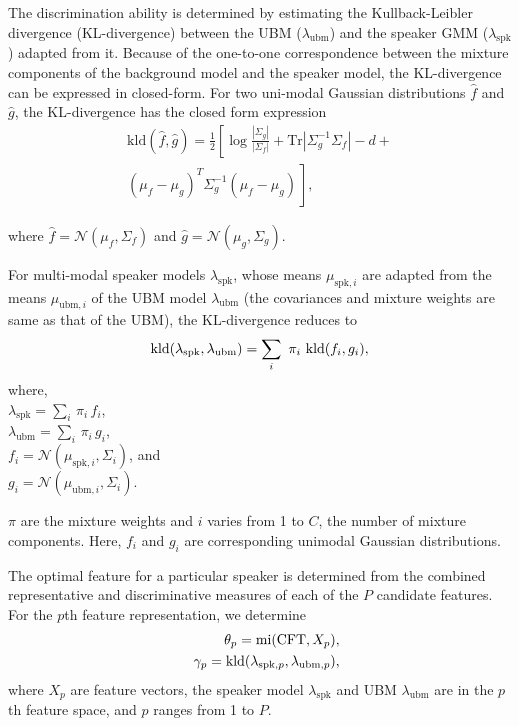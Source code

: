\documentclass[preprint,12pt,5p]{elsarticle}
\begin{document}
The discrimination ability is determined by estimating the Kullback-Leibler divergence
(KL-divergence) between the UBM ($\lambda_{\textrm{ubm}}$) and the speaker GMM ($\lambda_{\textrm{spk}}$)
adapted from it. Because of the one-to-one
correspondence between the mixture components of the background model and the speaker model, 
the KL-divergence can be expressed in closed-form. For two uni-modal Gaussian distributions
$\hat{f}$ and $\hat{g}$, the KL-divergence has the closed form expression
\begin{equation}
\begin{split}
\textrm{kld}(\hat{f},\hat{g}) = \frac{1}{2}\left[ \log \frac{|\Sigma_g|}{|\Sigma_f|} +
	\textrm{Tr}|\Sigma^{-1}_g\Sigma_f| - d + \right. \\ 
\left. (\mu_f-\mu_g)^T\Sigma_g^{-1}(\mu_f-\mu_g) \frac{}{} \right], 
\end{split}
\label{eq:kldGaussians}
\end{equation}

where $\hat{f} = \mathcal{N}(\mu_f,\Sigma_f)$ and $\hat{g} = \mathcal{N}(\mu_g,\Sigma_g)$.

For multi-modal speaker models $\lambda_{\textrm{spk}}$, whose means
$\mu_{\textrm{spk},i}$ are adapted from the means $\mu_{\textrm{ubm},i}$ of the UBM
model $\lambda_{\textrm{ubm}}$ (the covariances and mixture weights are same as
that of the UBM), the KL-divergence reduces to 
\begin{equation}
\textrm{kld}(\lambda_{\textrm{spk}},\lambda_{\textrm{ubm}}) = 
	\displaystyle \sum_i\ \pi_i\ \textrm{kld}(f_i,g_i),
\label{eq:gmmAdaptedKLD}
\vspace{-5mm}
\end{equation}
where, \\
$\lambda_{\textrm{spk}} = \displaystyle \sum_i \, \pi_i \, f_i$, \\
$\lambda_{\textrm{ubm}} = \displaystyle\sum_i \, \pi_i \, g_i$, \\
$f_i = \mathcal{N}(\mu_{\textrm{spk},i},\Sigma_i)$, and \\
$g_i = \mathcal{N}(\mu_{\textrm{ubm},i},\Sigma_i)$.

\noindent $\pi$ are the mixture weights and
$i$ varies from 1 to $C$, the number of mixture components. Here, $f_i$ and $g_i$ are
corresponding unimodal Gaussian distributions.


The optimal feature for a particular speaker is determined from the combined
representative and discriminative measures of each of the $P$ candidate
features. For the $p$th feature representation, we determine
\begin{eqnarray*}
\vspace{-3mm}
&& \theta_p = \textrm{mi}(\textrm{CFT},X_{p}), \\
&& \gamma_p =
\textrm{kld}(\lambda_{\textrm{spk},p},\lambda_{\textrm{ubm},p}),
\end{eqnarray*}
where $X_p$ are feature vectors, the speaker model $\lambda_{\textrm{spk}}$ and 
UBM $\lambda_{\textrm{ubm}}$ are in the $p$th feature space, and $p$ ranges from 1 to $P$.
\end{document}
